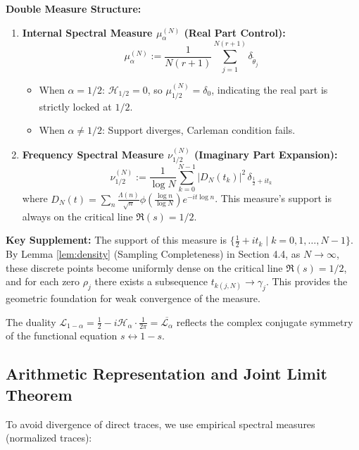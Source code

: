 \documentclass[12pt,a4paper]{amsart}
\theoremstyle{plain}
\theoremstyle{definition}
\theoremstyle{remark}
\begin{document}
\textbf{Double Measure Structure:}

\begin{enumerate}
    \item \textbf{Internal Spectral Measure $\mu_\alpha^{(N)}$ (Real Part Control):}
    \begin{equation}
    \mu_\alpha^{(N)} := \frac{1}{N(r+1)} \sum_{j=1}^{N(r+1)} \delta_{\tilde{\theta}_j}
    \end{equation}
    \begin{itemize}
        \item When $\alpha=1/2$: $\mathcal{H}_{1/2}=0$, so $\mu_{1/2}^{(N)} = \delta_0$, indicating the real part is strictly locked at $1/2$.
        \item When $\alpha\neq 1/2$: Support diverges, Carleman condition fails.
    \end{itemize}
    
    \item \textbf{Frequency Spectral Measure $\nu_{1/2}^{(N)}$ (Imaginary Part Expansion):}
    \begin{equation}
    \nu_{1/2}^{(N)} := \frac{1}{\log N} \sum_{k=0}^{N-1} |D_N(t_k)|^2 \,\delta_{\frac{1}{2} + i t_k}
    \end{equation}
    where $D_N(t)=\sum_{n} \frac{\Lambda(n)}{\sqrt{n}}\phi(\frac{\log n}{\log N}) e^{-it\log n}$. This measure's support is always on the critical line $\Re(s)=1/2$.
\end{enumerate}

\textbf{Key Supplement:} The support of this measure is $\{\frac{1}{2} + i t_k \mid k=0,1,\dots,N-1\}$. By Lemma \ref{lem:density} (Sampling Completeness) in Section 4.4, as $N\to\infty$, these discrete points become uniformly dense on the critical line $\Re(s)=1/2$, and for each zero $\rho_j$ there exists a subsequence $t_{k(j,N)} \to \gamma_j$. This provides the geometric foundation for weak convergence of the measure.

The duality $\mathcal{L}_{1-\alpha} = \frac{1}{2} - i\mathcal{H}_\alpha \cdot \frac{1}{2\pi} = \overline{\mathcal{L}_\alpha}$ reflects the complex conjugate symmetry of the functional equation $s\leftrightarrow 1-s$.

\subsection{Arithmetic Representation and Joint Limit Theorem}

To avoid divergence of direct traces, we use empirical spectral measures (normalized traces):
\end{document}
